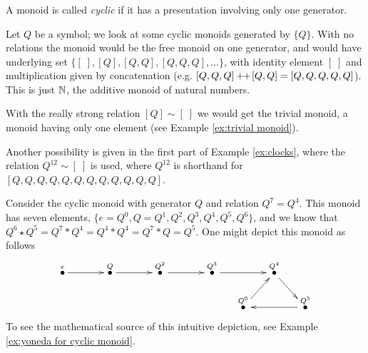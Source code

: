 \begin{exerciseRUS}
\end{exerciseRUS}


\subsubsection{}

\begin{definitionENG}
A monoid is called {\em cyclic} if it has a presentation involving only one generator. 
\end{definitionENG}

\begin{definitionRUS}
\end{definitionRUS}

\begin{exampleENG}\label{ex:cyclic}
Let $Q$ be a symbol; we look at some cyclic monoids generated by $\{Q\}$. With no relations the monoid would be the free monoid on one generator, and would have underlying set $\{[\;],[Q],[Q,Q],[Q,Q,Q],\ldots\}$, with identity element $[\;]$ and multiplication given by concatenation (e.g. $[Q,Q,Q]+\!\!+\hspace{1pt}[Q,Q]=[Q,Q,Q,Q,Q]$). This is just ${\mathbb N}$, the additive monoid of natural numbers.

With the really strong relation $[Q]\sim[\;]$ we would get the trivial monoid, a monoid having only one element (see Example \ref{ex:trivial monoid}).

Another possibility is given in the first part of Example \ref{ex:clocks}, where the relation $Q^{12}\sim[\;]$ is used, where $Q^{12}$ is shorthand for $[Q,Q,Q,Q,Q,Q,Q,Q,Q,Q,Q,Q]$.
\end{exampleENG}

\begin{exampleRUS}\label{ex:cyclic}
\end{exampleRUS}

\begin{exampleENG}\label{ex:cyclic monoid (7,4)}
Consider the cyclic monoid with generator $Q$ and relation $Q^7=Q^4$. This monoid has seven elements, $\{e=Q^0,Q=Q^1, Q^2, Q^3, Q^4, Q^5, Q^6\}$, and we know that $Q^6\star Q^5=Q^7*Q^4=Q^4*Q^4=Q^7*Q=Q^5.$ One might depict this monoid as follows
$$\xymatrix@=15pt{
\LMO{e}\ar[rr]&&\LMO{Q}\ar[rr]&&\LMO{Q^2}\ar[rr]&&\LMO{Q^3}\ar[rr]&&\LMO{Q^4}\ar[dr]\\
&&&&&&&\LMO{Q^6}\ar[ur]&&\LMO{Q^5}\ar[ll]
}
$$
To see the mathematical source of this intuitive depiction, see Example \ref{ex:yoneda for cyclic monoid}.
\end{exampleENG}

